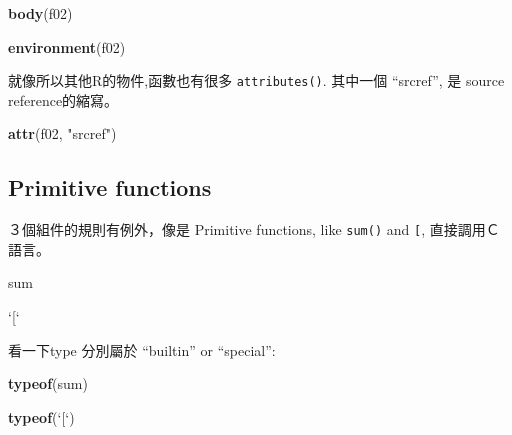 \documentclass[]{book}
\newenvironment{Shaded}{\begin{snugshade}}{\end{snugshade}}
\newcommand{\KeywordTok}[1]{\textcolor[rgb]{0.13,0.29,0.53}{\textbf{#1}}}
\newcommand{\DataTypeTok}[1]{\textcolor[rgb]{0.13,0.29,0.53}{#1}}
\newcommand{\StringTok}[1]{\textcolor[rgb]{0.31,0.60,0.02}{#1}}
\newcommand{\NormalTok}[1]{#1}
\theoremstyle{definition}
\theoremstyle{definition}
\theoremstyle{definition}
\theoremstyle{remark}
\begin{document}
\begin{Shaded}
\begin{Highlighting}[]
\KeywordTok{body}\NormalTok{(f02)}
\end{Highlighting}
\end{Shaded}

\begin{Shaded}
\begin{Highlighting}[]
\KeywordTok{environment}\NormalTok{(f02)}
\end{Highlighting}
\end{Shaded}

就像所以其他R的物件,函數也有很多 \texttt{attributes()}. 其中一個
``srcref'', 是 source reference的縮寫。 　

\begin{Shaded}
\begin{Highlighting}[]
\KeywordTok{attr}\NormalTok{(f02, }\StringTok{"srcref"}\NormalTok{)}
\end{Highlighting}
\end{Shaded}

\subsection{Primitive functions}\label{primitive-functions}

３個組件的規則有例外，像是 Primitive functions, like \texttt{sum()} and
\texttt{{[}}, 直接調用Ｃ語言。

\begin{Shaded}
\begin{Highlighting}[]
\NormalTok{sum}
\end{Highlighting}
\end{Shaded}

\begin{Shaded}
\begin{Highlighting}[]
\StringTok{`}\DataTypeTok{[}\StringTok{`}
\end{Highlighting}
\end{Shaded}

看一下type 分別屬於 ``builtin'' or ``special'':

\begin{Shaded}
\begin{Highlighting}[]
\KeywordTok{typeof}\NormalTok{(sum)}
\end{Highlighting}
\end{Shaded}

\begin{Shaded}
\begin{Highlighting}[]
\KeywordTok{typeof}\NormalTok{(}\StringTok{`}\DataTypeTok{[}\StringTok{`}\NormalTok{)}
\end{Highlighting}
\end{Shaded}
\end{document}
